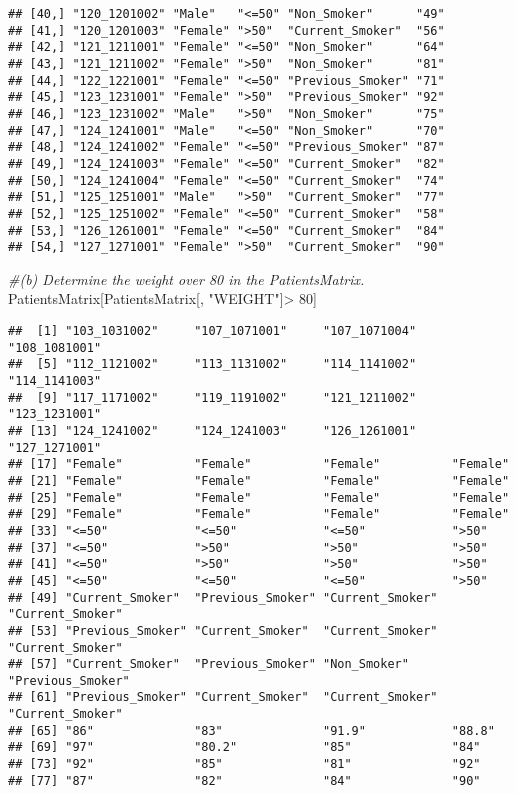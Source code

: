 \documentclass[
]{article}
\newenvironment{Shaded}{\begin{snugshade}}{\end{snugshade}}
\newcommand{\CommentTok}[1]{\textcolor[rgb]{0.56,0.35,0.01}{\textit{#1}}}
\newcommand{\DecValTok}[1]{\textcolor[rgb]{0.00,0.00,0.81}{#1}}
\newcommand{\NormalTok}[1]{#1}
\newcommand{\SpecialCharTok}[1]{\textcolor[rgb]{0.00,0.00,0.00}{#1}}
\newcommand{\StringTok}[1]{\textcolor[rgb]{0.31,0.60,0.02}{#1}}
\begin{document}
\begin{verbatim}
## [40,] "120_1201002" "Male"   "<=50" "Non_Smoker"      "49"   
## [41,] "120_1201003" "Female" ">50"  "Current_Smoker"  "56"   
## [42,] "121_1211001" "Female" "<=50" "Non_Smoker"      "64"   
## [43,] "121_1211002" "Female" ">50"  "Non_Smoker"      "81"   
## [44,] "122_1221001" "Female" "<=50" "Previous_Smoker" "71"   
## [45,] "123_1231001" "Female" ">50"  "Previous_Smoker" "92"   
## [46,] "123_1231002" "Male"   ">50"  "Non_Smoker"      "75"   
## [47,] "124_1241001" "Male"   "<=50" "Non_Smoker"      "70"   
## [48,] "124_1241002" "Female" "<=50" "Previous_Smoker" "87"   
## [49,] "124_1241003" "Female" "<=50" "Current_Smoker"  "82"   
## [50,] "124_1241004" "Female" "<=50" "Current_Smoker"  "74"   
## [51,] "125_1251001" "Male"   ">50"  "Current_Smoker"  "77"   
## [52,] "125_1251002" "Female" "<=50" "Current_Smoker"  "58"   
## [53,] "126_1261001" "Female" "<=50" "Current_Smoker"  "84"   
## [54,] "127_1271001" "Female" ">50"  "Current_Smoker"  "90"
\end{verbatim}

\begin{Shaded}
\begin{Highlighting}[]
\CommentTok{\#(b) Determine the weight over 80 in the PatientsMatrix.}
\NormalTok{PatientsMatrix[PatientsMatrix[, }\StringTok{"WEIGHT"}\NormalTok{]}\SpecialCharTok{\textgreater{}} \DecValTok{80}\NormalTok{]}
\end{Highlighting}
\end{Shaded}

\begin{verbatim}
##  [1] "103_1031002"     "107_1071001"     "107_1071004"     "108_1081001"    
##  [5] "112_1121002"     "113_1131002"     "114_1141002"     "114_1141003"    
##  [9] "117_1171002"     "119_1191002"     "121_1211002"     "123_1231001"    
## [13] "124_1241002"     "124_1241003"     "126_1261001"     "127_1271001"    
## [17] "Female"          "Female"          "Female"          "Female"         
## [21] "Female"          "Female"          "Female"          "Female"         
## [25] "Female"          "Female"          "Female"          "Female"         
## [29] "Female"          "Female"          "Female"          "Female"         
## [33] "<=50"            "<=50"            "<=50"            ">50"            
## [37] "<=50"            ">50"             ">50"             ">50"            
## [41] "<=50"            ">50"             ">50"             ">50"            
## [45] "<=50"            "<=50"            "<=50"            ">50"            
## [49] "Current_Smoker"  "Previous_Smoker" "Current_Smoker"  "Current_Smoker" 
## [53] "Previous_Smoker" "Current_Smoker"  "Current_Smoker"  "Current_Smoker" 
## [57] "Current_Smoker"  "Previous_Smoker" "Non_Smoker"      "Previous_Smoker"
## [61] "Previous_Smoker" "Current_Smoker"  "Current_Smoker"  "Current_Smoker" 
## [65] "86"              "83"              "91.9"            "88.8"           
## [69] "97"              "80.2"            "85"              "84"             
## [73] "92"              "85"              "81"              "92"             
## [77] "87"              "82"              "84"              "90"
\end{verbatim}
\end{document}
